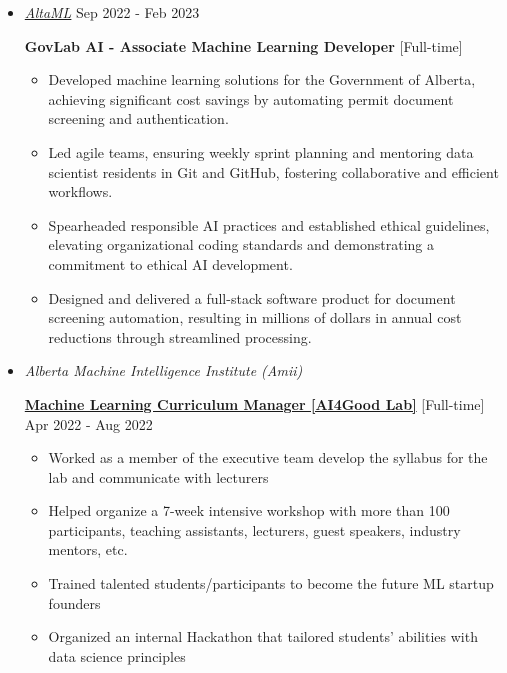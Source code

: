\documentclass[10pt,letterpaper,roman]{moderncv} %
\begin{document}
	\vspace{0.5cm}
	\begin{itemize}
		\item \href{http://altaml.com/}{ \emph{\large AltaML}} \hfill Sep 2022 - Feb 2023
		\vspace{0.25cm}
		
		\textbf{GovLab AI - Associate Machine Learning Developer} [Full-time]
		
		\begin{itemize}
\item Developed machine learning solutions for the Government of Alberta, achieving significant cost savings by automating permit document screening and authentication.

\item Led agile teams, ensuring weekly sprint planning and mentoring data scientist residents in Git and GitHub, fostering collaborative and efficient workflows.

\item Spearheaded responsible AI practices and established ethical guidelines, elevating organizational coding standards and demonstrating a commitment to ethical AI development.

\item Designed and delivered a full-stack software product for document screening automation, resulting in millions of dollars in annual cost reductions through streamlined processing.
		\end{itemize}
		
\vspace{0.5cm}
		\item \href{https://amii.ca/}{} \emph{\large Alberta Machine Intelligence Institute (Amii)}
		\vspace{0.25cm}
		
		\href{http://ai4goodlab.com/}{%
			\textbf{Machine Learning Curriculum Manager [AI4Good Lab]}}  [Full-time] \hfill Apr 2022 - Aug 2022
		
		\begin{itemize}
			\item Worked as a member of the executive team develop the syllabus for the lab and communicate with lecturers
			\item Helped organize a 7-week intensive workshop with more than 100 participants, teaching assistants, lecturers, guest speakers, industry mentors, etc.
			\item Trained talented students/participants to become the future ML startup founders
			\item Organized an internal Hackathon that tailored students' abilities with data science principles
		\end{itemize}
		

\end{itemize}
\end{document}
